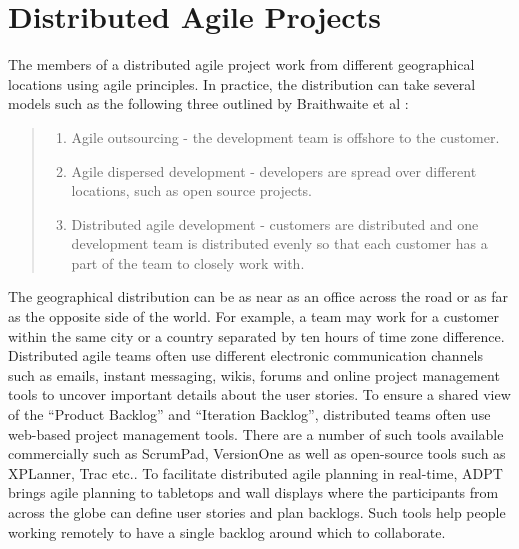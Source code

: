 \section{Distributed Agile Projects}
The members of a distributed agile project work from different geographical locations using agile principles. In practice, the distribution can take several models such as the following three outlined by Braithwaite et al \cite{xp_expanded}:

\begin{quote}
\begin{enumerate}
	\item Agile outsourcing - the development team is offshore to the customer.
	\item Agile dispersed development - developers are spread over different locations, such as open source projects.
	\item Distributed agile development - customers are distributed and one development team is distributed evenly so that each customer has a part of the team to closely work with.
\end{enumerate}
\end{quote}

The geographical distribution can be as near as an office across the road or as far as the opposite side of the world. For example, a team may work for a customer within the same city or a country separated by ten hours of time zone difference. Distributed agile teams often use different electronic communication channels such as emails, instant messaging, wikis, forums and online project management tools to uncover important details about the user stories. To ensure a shared view of the ``Product Backlog'' and ``Iteration Backlog'', distributed teams often use web-based project management tools. There are a number of such tools available commercially such as ScrumPad, VersionOne \cite{scrum_pad, version_one} as well as open-source tools such as XPLanner, Trac etc.\cite{xplanner, trac}. To facilitate distributed agile planning in real-time, ADPT brings agile planning to tabletops and wall displays where the participants from across the globe can define user stories and plan backlogs\cite{adpt}. Such tools help people working remotely to have a single backlog around which to collaborate.

